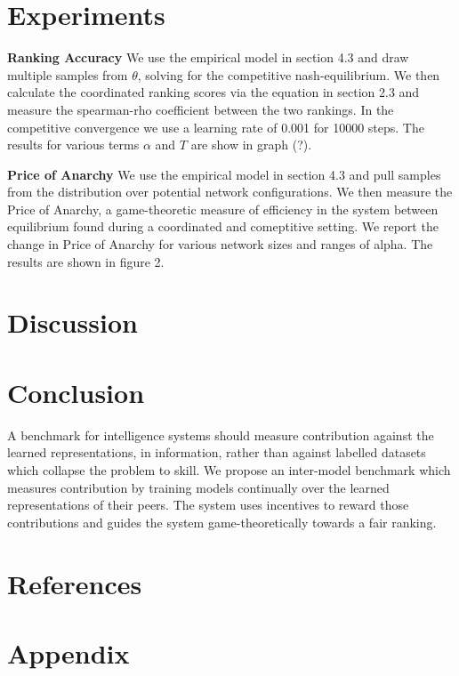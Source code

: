 \documentclass{article}
\begin{document}
\section{Experiments}

\textbf{Ranking Accuracy} We use the empirical model in section 4.3 and draw multiple samples from $\theta$, solving for the competitive nash-equilibrium. We then calculate the coordinated ranking scores via the equation in section 2.3 and measure the spearman-rho coefficient between the two rankings. In the competitive convergence we use a learning rate of 0.001 for 10000 steps. The results for various terms $\alpha$ and $T$ are show in graph (?). 
\smallskip

\textbf{Price of Anarchy} We use the empirical model in section 4.3 and pull samples from the distribution over potential network configurations. We then measure the Price of Anarchy, a game-theoretic measure of efficiency in the system between equilibrium found during a coordinated and comeptitive setting. We report the change in Price of Anarchy for various network sizes and ranges of alpha. The results are shown in figure 2.
\smallskip


\section{Discussion}


\section{Conclusion}

A benchmark for intelligence systems should measure contribution against the learned representations, in information, rather than against labelled datasets which collapse the problem to skill. We propose an inter-model benchmark which measures contribution by training models continually over the learned representations of their peers. The system uses incentives to reward those contributions and guides the system game-theoretically towards a fair ranking. 



\section{References}




\section{Appendix}
\end{document}
